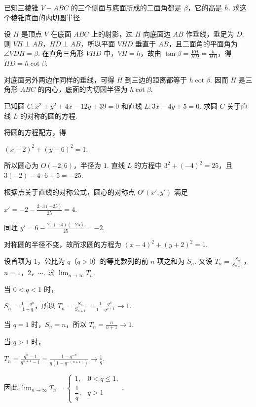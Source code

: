 \documentclass[UTF8,a4paper,oneside,11pt]{ctexbook}
\begin{document}
\begin{problem}

已知三棱锥 \(V-ABC\) 的三个侧面与底面所成的二面角都是 \(\beta\)，它的高是 \(h\). 求这个棱锥底面的内切圆半径.
\end{problem}

\begin{solution}
设 \(H\) 是顶点 \(V\) 在底面 \(ABC\) 上的射影，过 \(H\) 向底面边 \(AB\) 作垂线，垂足为 \(D\). 则 \(VH\perp AB\)，\(HD\perp AB\)，所以平面 \(VHD\) 垂直于 \(AB\)，且二面角的平面角为 \(\angle VDH=\beta\). 在直角三角形 \(VHD\) 中，\(VH=h\)，故由 \(\tan\beta=\frac{VH}{HD}=\frac{h}{HD}\)，得 \(HD=h\cot\beta\).

对底面另外两边作同样的垂线，可得 \(H\) 到三边的距离都等于 \(h\cot\beta\). 因而 \(H\) 是三角形 \(ABC\) 的内心，底面的内切圆半径为 \(h\cot\beta\).
\end{solution}

\begin{problem}

已知圆 \(C:x^2+y^2+4x-12y+39=0\) 和直线 \(L:3x-4y+5=0\). 求圆 \(C\) 关于直线 \(L\) 的对称的圆的方程.
\end{problem}

\begin{solution}
将圆的方程配方，得

\(\left(x+2\right)^2+\left(y-6\right)^2=1\).

所以圆心为 \(O\left(-2,6\right)\)，半径为 \(1\). 直线 \(L\) 的方程中 \(3^2+\left(-4\right)^2=25\)，且
\(3\left(-2\right)-4\cdot6+5=-25\).

根据点关于直线的对称公式，圆心的对称点 \(O'\left(x',y'\right)\) 满足

\(x'=-2-\frac{2\cdot3\left(-25\right)}{25}=4\).

同理 \(y'=6-\frac{2\cdot\left(-4\right)\left(-25\right)}{25}=-2\).

对称圆的半径不变，故所求圆的方程为 \(\left(x-4\right)^2+\left(y+2\right)^2=1\).
\end{solution}

\begin{problem}

设首项为 \(1\)，公比为 \(q\)（\(q>0\)）的等比数列的前 \(n\) 项之和为 \(S_n\). 又设 \(T_n=\frac{S_n}{S_{n+1}}\)，\(n=1\)，\(2\)，\(\cdots\). 求 \(\displaystyle\lim_{n\to\infty} T_n\).
\end{problem}

\begin{solution}
当 \(0<q<1\) 时，

\(S_n=\frac{1-q^n}{1-q}\)，所以 \(T_n=\frac{S_n}{S_{n+1}}=\frac{1-q^n}{1-q^{n+1}}\longrightarrow1\).

当 \(q=1\) 时，\(S_n=n\)，所以 \(T_n=\frac{n}{n+1}\longrightarrow1\).

当 \(q>1\) 时，

\(T_n=\frac{q^n-1}{q^{n+1}-1}=\frac{1-q^{-n}}{q\left(1-q^{-(n+1)}\right)}\longrightarrow\frac{1}{q}\).

因此 \(\displaystyle\lim_{n\to\infty}T_n=\begin{cases}
1, & 0<q\leqslant1,\\
\dfrac{1}{q}, & q>1
\end{cases}\).
\end{solution}

\end{document}
